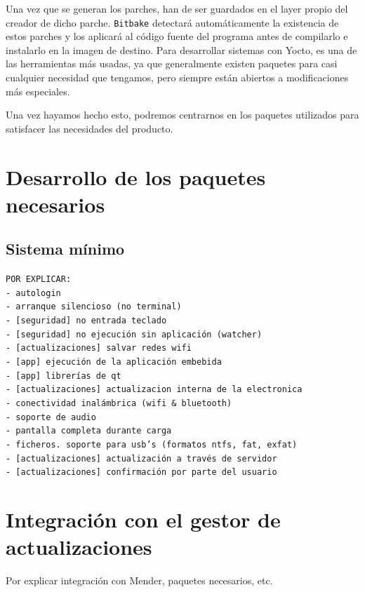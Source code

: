 Una vez que se generan los parches, han de ser guardados en el layer propio del creador de dicho parche. \texttt{Bitbake} detectará automáticamente la existencia de estos parches y los aplicará al código fuente del programa antes de compilarlo e instalarlo en la imagen de destino. Para desarrollar sistemas con Yocto, es una de las herramientas más usadas, ya que generalmente existen paquetes para casi cualquier necesidad que tengamos, pero siempre están abiertos a modificaciones más especiales.

Una vez hayamos hecho esto, podremos centrarnos en los paquetes utilizados para satisfacer las necesidades del producto.
\section{Desarrollo de los paquetes necesarios}



\subsection{Sistema mínimo}


\texttt{POR EXPLICAR:\\
	- autologin\\
	- arranque silencioso (no terminal)\\
	- [seguridad] no entrada teclado\\
	- [seguridad] no ejecución sin aplicación (watcher)\\
	- [actualizaciones] salvar redes wifi\\
	- [app] ejecución de la aplicación embebida\\
	- [app] librerías de qt\\
	- [actualizaciones] actualizacion interna de la electronica\\
	- conectividad inalámbrica (wifi \& bluetooth)\\
	- soporte de audio\\
	- pantalla completa durante carga\\
	- ficheros. soporte para usb's (formatos ntfs, fat, exfat)\\
	- [actualizaciones] actualización a través de servidor\\
	- [actualizaciones] confirmación por parte del usuario}\\

\section{Integración con el gestor de actualizaciones}

Por explicar integración con Mender, paquetes necesarios, etc.

\newpage